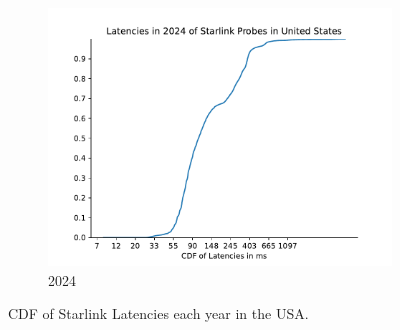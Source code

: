 \begin{figure}
\begin{subfigure}[b]{0.3\linewidth}
		\includegraphics[width=\linewidth]{chapters/4-results/latency/img/cdf_latencies_in_2024_of_starlink_probes_in_united_states.pdf}
		\caption{2024}
	\end{subfigure}
	\caption{CDF of Starlink Latencies each year in the USA.}
	\label{fig:latency-cdfs-usa}
\end{figure}

